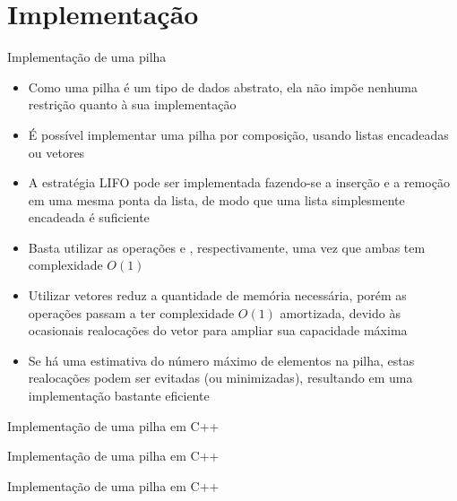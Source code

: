 \section{Implementação}

\begin{frame}[fragile]{Implementação de uma pilha}

    \begin{itemize}
        \item Como uma pilha é um tipo de dados abstrato, ela não impõe nenhuma restrição
            quanto à sua implementação

        \item É possível implementar uma pilha por composição, usando listas encadeadas ou vetores

        \item A estratégia LIFO pode ser implementada fazendo-se a inserção e a remoção em uma
            mesma ponta da lista, de modo que uma lista simplesmente encadeada é suficiente

        \item Basta utilizar as operações  e , 
            respectivamente, uma vez que ambas tem complexidade $O(1)$

        \item Utilizar vetores reduz a quantidade de memória necessária, porém as operações passam
            a ter complexidade $O(1)$ amortizada, devido às ocasionais realocações do vetor para
            ampliar sua capacidade máxima

        \item Se há uma estimativa do número máximo de elementos na pilha, estas realocações
            podem ser evitadas (ou minimizadas), resultando em uma implementação bastante
            eficiente
    \end{itemize}

\end{frame}

\begin{frame}[fragile]{Implementação de uma pilha em C++}
\end{frame}

\begin{frame}[fragile]{Implementação de uma pilha em C++}
\end{frame}

\begin{frame}[fragile]{Implementação de uma pilha em C++}
\end{frame}

